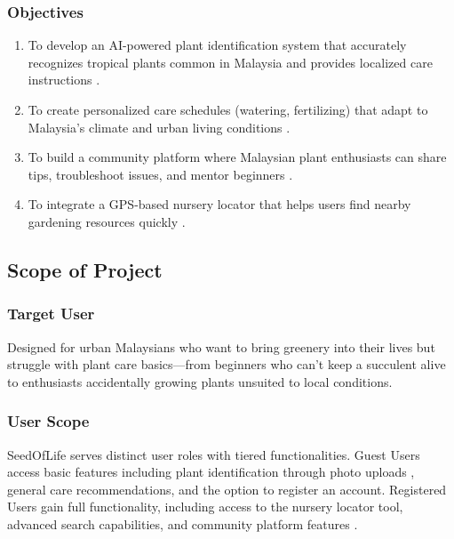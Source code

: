 \documentclass[conference]{IEEEtran}
\begin{document}
\subsubsection{Objectives}
\label{sssec:objectives}
\begin{enumerate}
    \item To develop an AI-powered plant identification system that accurately recognizes tropical plants common in Malaysia and provides localized care instructions \cite{chen2023, plantnet2024}.
    
    \item To create personalized care schedules (watering, fertilizing) that adapt to Malaysia's climate and urban living conditions \cite{wong2023}.
    
    \item To build a community platform where Malaysian plant enthusiasts can share tips, troubleshoot issues, and mentor beginners \cite{ugam2024}.
    
    \item To integrate a GPS-based nursery locator that helps users find nearby gardening resources quickly \cite{moa2023}.
\end{enumerate}

\subsection{Scope of Project}
\label{subsec:scope-project}

\subsubsection{Target User}
\label{sssec:target-user}
Designed for urban Malaysians who want to bring greenery into their lives but struggle 
with plant care basics—from beginners who can't keep a succulent alive to enthusiasts accidentally 
growing plants unsuited to local conditions.

\subsubsection{User Scope}
\label{sssec:user-scope}
SeedOfLife serves distinct user roles with tiered functionalities. Guest Users access basic features including plant identification through photo uploads \cite{plantnet2024}, general care recommendations, and the option to register an account. Registered Users gain full functionality, including access to the nursery locator tool, advanced search capabilities, and community platform features \cite{firebase2024}.
\end{document}
